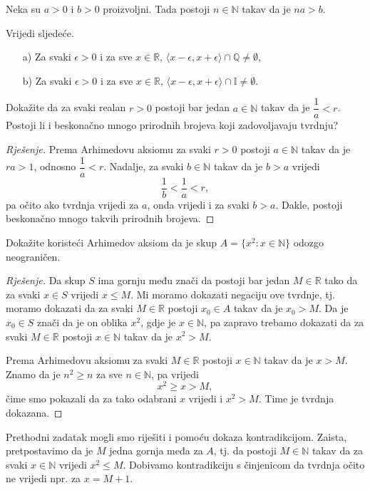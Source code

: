 \begin{remark}
Neka su $a>0$ i $b>0$ proizvoljni. Tada postoji $n\in \mathbb{N}$ takav da je $na>b$.
\end{remark}
\begin{remark} Vrijedi sljedeće.
\label{den}
\textbf{}
\begin{itemize}
\item[a)] Za svaki $\epsilon>0$ i za sve $x\in \mathbb{R}$, $\langle x-\epsilon, x+\epsilon\rangle\cap \mathbb{Q}\neq \emptyset$,
\item[b)] Za svaki $\epsilon>0$ i za sve $x\in \mathbb{R}$, $\langle x-\epsilon, x+\epsilon\rangle\cap \mathbb{I}\neq \emptyset$.
\end{itemize}
\end{remark}
\begin{exercise}
Dokažite da za svaki realan $r>0$ postoji bar jedan $a\in \mathbb{N}$ takav da je $\dfrac{1}{a}<r$. Postoji li i beskonačno mnogo prirodnih brojeva koji zadovoljavaju tvrdnju?
\end{exercise}
\begin{proof}[Rješenje]
Prema Arhimedovu aksiomu za svaki $r>0$ postoji $a\in \mathbb{N}$ takav da je $ra>1$, odnosno $\dfrac{1}{a}<r$. Nadalje, za svaki $b\in \mathbb{N}$ takav da je $b>a$ vrijedi $$\dfrac{1}{b}<\dfrac{1}{a}<r,$$ pa očito ako tvrdnja vrijedi za $a$, onda vrijedi i za svaki $b>a$. Dakle, postoji beskonačno mnogo takvih prirodnih brojeva.
\end{proof}
\begin{exercise}
\label{12}
Dokažite koristeći Arhimedov aksiom da je skup $A=\{x^2 : x\in \mathbb{N}\}$ odozgo neograničen.
\end{exercise}
\begin{proof}[Rješenje]
Da skup $S$ ima gornju među znači da postoji bar jedan $M\in \mathbb{R}$ tako da za svaki $x\in S$ vrijedi $x\leq M$. Mi moramo dokazati negaciju ove tvrdnje, tj. moramo dokazati da za svaki $M\in \mathbb{R}$ postoji $x_0\in A$ takav da je $x_0>M$. Da je $x_0\in S$ znači da je on oblika $x^2$, gdje je $x\in \mathbb{N}$, pa zapravo trebamo dokazati da za svaki $M\in \mathbb{R}$ postoji $x\in \mathbb{N}$ takav da je $x^2>M$. 

Prema Arhimedovu aksiomu za svaki $M\in \mathbb{R}$ postoji $x\in \mathbb{N}$ takav da je $x>M$. Znamo da je $n^2\geq n$ za sve $n\in \mathbb{N}$, pa vrijedi $$x^2\geq x>M,$$ 
čime smo pokazali da za tako odabrani $x$ vrijedi i $x^2>M$. Time je tvrdnja dokazana.
\end{proof}
\begin{remark}
Prethodni zadatak mogli smo riješiti i pomoću dokaza kontradikcijom. Zaista, pretpostavimo da je $M$ jedna gornja međa za $A$, tj. da postoji $M\in \mathbb{N}$ takav da za svaki $x\in \mathbb{N}$ vrijedi $x^2\leq M$. Dobivamo kontradikciju s činjenicom da tvrdnja očito ne vrijedi npr. za $x=M+1$.
\end{remark}

